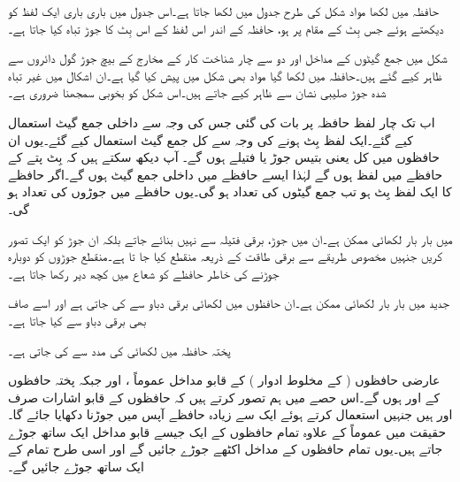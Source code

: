 حافظہ میں لکھا مواد شکل کی طرح جدول میں لکھا جاتا ہے۔اس جدول میں باری باری ایک لفظ کو دیکھتے ہوئے جس بِٹ کے مقام پر  ہو، حافظہ کے اندر اس لفظ کے اس بِٹ کا جوڑ تباہ کیا جاتا ہے۔


شکل  میں جمع گیٹوں کے مداخل اور دو سے چار شناخت کار کے مخارج کے بیچ جوڑ گول دائروں سے ظاہر کیے گئے ہیں۔حافظہ میں لکھا گیا مواد بھی شکل  میں پیش کیا گیا ہے۔ان اشکال میں غیر تباہ شدہ جوڑ صلیبی نشان  سے ظاہر کیے جاتے ہیں۔اس شکل کو بخوبی سمجھنا ضروری ہے۔

اب تک چار لفظ حافظہ پر بات کی گئی جس کی وجہ سے  داخلی جمع گیٹ استعمال کیے گئے۔ایک لفظ  بِٹ ہونے کی وجہ سے کل  جمع گیٹ استعمال کیے گئے۔یوں ان حافظوں میں کل  یعنی بتیس  جوڑ یا فتیلے ہوں گے۔ آپ دیکھ سکتے ہیں کہ  بِٹ پتے کے حافظے میں  لفظ ہوں گے لہٰذا ایسے حافظے میں  داخلی جمع گیٹ ہوں گے۔اگر حافظے کا ایک لفظ  بِٹ ہو تب جمع گیٹوں کی تعداد  ہو گی۔یوں حافظے میں جوڑوں کی تعداد  ہو گی۔

 میں بار بار لکھائی ممکن ہے۔ان میں جوڑ، برقی فتیلہ سے نہیں بنائے جاتے بلکہ ان جوڑ کو ایک تصور کریں جنہیں مخصوص طریقے سے برقی طاقت کے ذریعہ منقطع کیا جا تا ہے۔منقطع جوڑوں کو دوبارہ جوڑنے کی خاطر حافظے کو شعاع میں کچھ دیر رکھا جاتا ہے۔

جدید میں بار بار لکھائی ممکن ہے۔ان حافظوں میں لکھائی برقی دباو سے کی جاتی ہے اور اسے صاف بھی برقی دباو سے کیا جاتا ہے۔

پختہ حافظہ میں لکھائی  کی مدد سے کی جاتی ہے۔
	

عارضی حافظوں ( کے مخلوط ادوار ) کے قابو مداخل عموماً ، اور  جبکہ پختہ حافظوں کے  اور  ہوں گے۔اس حصے میں ہم تصور کرتے ہیں کہ حافظوں کے قابو اشارات صرف  اور  ہیں جنہیں استعمال کرتے ہوئے ایک سے زیادہ حافظے آپس میں جوڑنا دکھایا جائے گا۔حقیقت میں عموماً  کے علاوہ تمام حافظوں کے ایک جیسے قابو مداخل ایک ساتھ جوڑے جاتے ہیں۔یوں تمام حافظوں کے  مداخل اکٹھے جوڑے جائیں گے اور اسی طرح تمام کے  ایک ساتھ جوڑے جائیں گے۔

